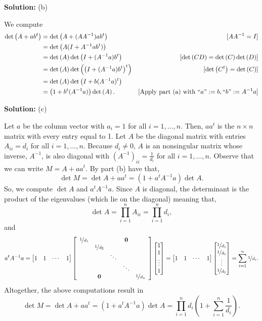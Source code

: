\documentclass{article}
\begin{document}
\textbf{Solution:} (b)

We compute
	\begin{align*}
		\det{A + ab^t} & = \det{A + (AA^{-1}) ab^t} & [AA^{-1} = I]\\
				      & = \det{A(I+A^{-1} ab^t)}\\
				      & = \det{A}\det{I+ (A^{-1}a)b^t} & [\det{CD} = \det{C}\det{D}]\\
				      & = \det{A}\det{\left(I+ (A^{-1}a)b^t\right)^t} & [\det{C^t} = \det{C}]\\
				      & = \det{A}\det{I + b (A^{-1}a)^t}\\
				      & = \left(1 + b^t(A^{-1} a)\right)\det{A}. & [\text{Apply part (a) with } ``a":= b, ``b":=A^{-1}a]
	\end{align*}

\textbf{Solution:} (c) 

Let $a$ be the column vector with $a_i = 1$ for all $i=1,\dots, n$. Then, $aa^t$ is the $n\times n$ matrix with every entry equal to 1. Let $A$ be the diagonal matrix with entries $A_{ii} = d_i$ for all $i=1,\dots, n$. Because $d_i\neq0$, $A$ is an nonsingular matrix whose inverse, $A^{-1}$, is also diagonal with $(A^{-1})_{ii} = \frac{1}{d_i}$ for all $i=1,\dots, n$. Observe that we can write $M = A + aa^t$. By part (b) have that,
	\[\det{M} = \det{A + aa^t} = (1 + a^t A^{-1} a)\det{A}.\]
So, we compute $\det{A}$ and $a^t A^{-1} a$. Since $A$ is diagonal, the determinant is the product of the eigenvalues (which lie on the diagonal) meaning that,
	 \[\det{A} = \prod_{i=1}^n A_{ii} = \prod_{i=1}^n d_i,\]
and 
	\[a^t A^{-1} a = \begin{bmatrix} 
					1 & 1 & \cdots & 1
				\end{bmatrix}
				\begin{bmatrix}
					\begin{array}{ccccc}
 						\nicefrac{1}{d_1} &    &  & \mathbf 0   &   \\
 						  & \nicefrac{1}{d_2} &   &   &   \\
 						  &   & \ddots &   &   \\
 						  &   &   & \ddots &   \\
 						  &  \mathbf 0 &  &   & \nicefrac{1}{d_n} 
					\end{array}
				\end{bmatrix}
				\begin{bmatrix} 
					1 \\ 1 \\ \vdots \\ 1
				\end{bmatrix}
				=
				 \begin{bmatrix} 
					1 & 1 & \cdots & 1
				\end{bmatrix}
				\begin{bmatrix} 
					\nicefrac{1}{d_1} \\ \nicefrac{1}{d_1} \\ \vdots \\ \nicefrac{1}{d_1}
				\end{bmatrix}
				=
				\sum_{i=1}^n \nicefrac{1}{d_i}.
				\] 
Altogether, the above computations result in 
	\[\det{M} = \det{A + aa^t} = (1 + a^t A^{-1} a)\det{A} = \prod_{i=1}^n d_i \left( 1 + \sum_{i=1}^n \frac{1}{d_i} \right).\]
\end{document}
